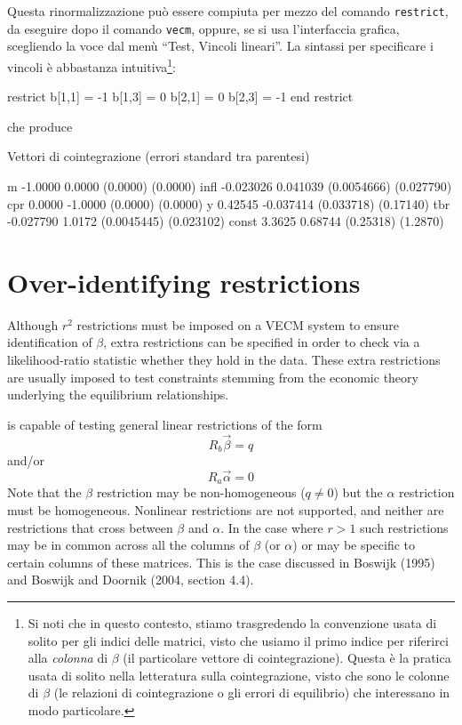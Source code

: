 Questa rinormalizzazione può essere compiuta per mezzo del comando
\texttt{restrict}, da eseguire dopo il comando \texttt{vecm}, oppure, se si usa
l'interfaccia grafica, scegliendo la voce dal menù ``Test, Vincoli lineari''.
La sintassi per specificare i vincoli è abbastanza intuitiva\footnote{Si noti che
  in questo contesto, stiamo trasgredendo la convenzione usata di solito per gli
  indici delle matrici, visto che usiamo il primo indice per riferirci alla
  \textit{colonna} di $\beta$ (il particolare vettore di cointegrazione).
  Questa è la pratica usata di solito nella letteratura sulla cointegrazione,
  visto che sono le colonne di $\beta$ (le relazioni di cointegrazione o gli
  errori di equilibrio) che interessano in modo particolare.}:
\begin{code}
restrict
  b[1,1] = -1
  b[1,3] = 0
  b[2,1] = 0
  b[2,3] = -1
end restrict
\end{code}
che produce

\begin{code}
Vettori di cointegrazione (errori standard tra parentesi)

m          -1.0000       0.0000 
           (0.0000)     (0.0000) 
infl     -0.023026     0.041039 
        (0.0054666)   (0.027790) 
cpr         0.0000      -1.0000 
           (0.0000)     (0.0000) 
y          0.42545    -0.037414 
         (0.033718)    (0.17140) 
tbr      -0.027790       1.0172 
        (0.0045445)   (0.023102) 
const       3.3625      0.68744 
          (0.25318)     (1.2870) 
\end{code}

\section{Over-identifying restrictions}
\label{sec:johansen-overid}

Although $r^2$ restrictions must be imposed on a VECM system to
ensure identification of $\beta$, extra restrictions can be specified
in order to check via a likelihood-ratio statistic whether they hold
in the data. These extra restrictions are usually imposed to test
constraints stemming from the economic theory underlying the
equilibrium relationships.

 is capable of testing general linear restrictions of the
form 
\begin{equation}
\label{eq:Rb}
R_b \vec{\beta} = q
\end{equation}
and/or
\begin{equation}
\label{eq:Ra}
R_a \vec{\alpha} = 0
\end{equation}
%
Note that the $\beta$ restriction may be non-homogeneous ($q \neq 0$)
but the $\alpha$ restriction must be homogeneous.  Nonlinear
restrictions are not supported, and neither are restrictions that
cross between $\beta$ and $\alpha$.  In the case where $r > 1$ such
restrictions may be in common across all the columns of $\beta$ (or
$\alpha$) or may be specific to certain columns of these matrices.
This is the case discussed in Boswijk (1995) and Boswijk and Doornik
(2004, section 4.4).

